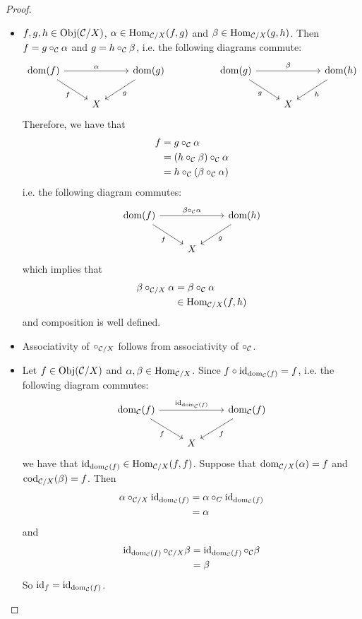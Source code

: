 \documentclass{book}
\begin{document}
	\begin{proof}\
		\begin{itemize}
			\item $f,g, h \in \operatorname{Obj}(\mathcal{C} / X)$, $\alpha \in \operatorname{Hom}_{\mathcal{C} / X}(f, g)$ and $\beta \in \operatorname{Hom}_{\mathcal{C} / X}(g, h)$. Then $f = g \circ_{\mathcal{C}} \alpha$ and $g = h \circ_{\mathcal{C}} \beta$, i.e. the following diagrams commute:
			\[ \begin{tikzcd}
				\dom(f) \arrow[rr, "\al"] \arrow[dr, "f"'] 	
				&& \dom(g)  \arrow[dl, "g"]  
				&& \dom(g) \arrow[rr, "\be"] \arrow[dr, "g"'] 	
				&& \dom(h)  \arrow[dl, "h"]\\
				& X 
				&& &&X
			\end{tikzcd}
			\]
			Therefore, we have that 
			\begin{align*}
				f 
				& = g \circ_{\mathcal{C}} \alpha \\
				& = (h \circ_{\mathcal{C}} \beta) \circ_{\mathcal{C}} \alpha \\
				&= h \circ_{\mathcal{C}} (\beta \circ_{\mathcal{C}} \alpha) 
			\end{align*}
			i.e. the following diagram commutes:
			\[ 
			\begin{tikzcd}
				\dom(f) \arrow[rr, "\be \circ_{\MC} \al"] \arrow[dr, "f"'] 	
				& & \dom(h)  \arrow[dl, "g"] \\
				& X 
			\end{tikzcd}
			\]
			which implies that 
			\begin{align*}
				\beta \circ_{\mathcal{C} / X} \alpha 
				& = \beta \circ_{\mathcal{C}} \alpha \\
				& \in \operatorname{Hom}_{\mathcal{C} / X}(f, h)
			\end{align*}
			and composition is well defined. 
			\item Associativity of $\circ_{\mathcal{C} / X}$ follows from associativity of $\circ_{\mathcal{C}}$.
			\item Let $f \in \operatorname{Obj}(\mathcal{C} / X)$ and $\alpha, \beta \in \operatorname{Hom}_{\mathcal{C} / X}$. Since $f \circ \operatorname{id}_{\operatorname{dom}_{\mathcal{C}}(f)} = f$, i.e. the following diagram commutes: 
			\[ \begin{tikzcd}
				\dom_{\MC}(f) \arrow[rr, "\id_{\dom_{\MC}(f)}"] \arrow[dr, "f"'] 	
				& & \dom_{\MC}(f)  \arrow[dl, "f"] \\
				& X 
			\end{tikzcd}
			\]
			we have that $\operatorname{id}_{\operatorname{dom}_{\mathcal{C}}(f)} \in \operatorname{Hom}_{\mathcal{C} / X}(f, f)$.
			Suppose that $\operatorname{dom}_{\mathcal{C} / X}(\alpha) = f$ and $\operatorname{cod}_{\mathcal{C} /X}(\beta) = f$. Then 
			\begin{align*}
				\alpha \circ_{\mathcal{C} /X} \operatorname{id}_{\operatorname{dom}_{\mathcal{C}}(f)}
				&= \alpha \circ_{C} \operatorname{id}_{\operatorname{dom}_{\mathcal{C}}(f)} \\
				&= \alpha
			\end{align*}
			and 
			\begin{align*}
				\operatorname{id}_{\operatorname{dom}_{\mathcal{C}}(f)} \circ_{\mathcal{C} /X} \beta
				&= \operatorname{id}_{\operatorname{dom}_{\mathcal{C}}(f)} \circ_{\mathcal{C}} \beta \\
				&= \beta
			\end{align*}
			So $\operatorname{id}_f = \operatorname{id}_{\operatorname{dom}_{\mathcal{C}}(f)}$.
		\end{itemize}
	\end{proof}
\end{document}

